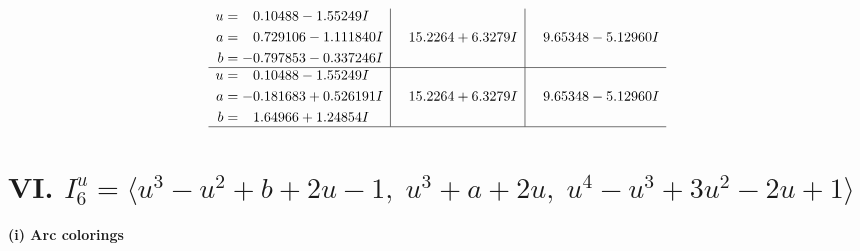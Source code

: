 \documentclass[1p]{elsarticle_modified}
\theoremstyle{definition}
\begin{document}
$$\begin{array}{c|c|c}
\begin{aligned}
u &= \phantom{-}0.10488 - 1.55249 I \\
a &= \phantom{-}0.729106 - 1.111840 I \\
b &= -0.797853 - 0.337246 I\end{aligned}
 & \phantom{-}15.2264 + 6.3279 I & \phantom{-}9.65348 - 5.12960 I \\ \hline\begin{aligned}
u &= \phantom{-}0.10488 - 1.55249 I \\
a &= -0.181683 + 0.526191 I \\
b &= \phantom{-}1.64966 + 1.24854 I\end{aligned}
 & \phantom{-}15.2264 + 6.3279 I & \phantom{-}9.65348 - 5.12960 I\\
 \hline 
 \end{array}$$\newpage\newpage\renewcommand{\arraystretch}{1}
\centering \section*{VI. $I^u_{6}= \langle u^3- u^2+b+2 u-1,\;u^3+a+2 u,\;u^4- u^3+3 u^2-2 u+1 \rangle$}
\flushleft \textbf{(i) Arc colorings}\\
\end{document}
